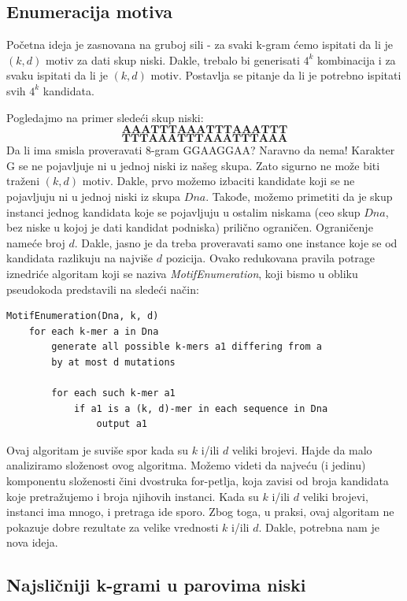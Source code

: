 \subsection{Enumeracija motiva}
Početna ideja je zasnovana na gruboj sili - za svaki k-gram ćemo ispitati da li je $(k, d)$ motiv za dati skup niski. Dakle, trebalo bi generisati $4^k$ kombinacija i za svaku ispitati da li je $(k, d)$ motiv. Postavlja se pitanje da li je potrebno ispitati svih $4^k$ kandidata. 

\noindent Pogledajmo na primer sledeći skup niski:
$$\textbf{AAATTTAAATTTAAATTT}$$ 
$$\textbf{TTTAAATTTAAATTTAAA}$$
Da li ima smisla proveravati 8-gram GGAAGGAA?
Naravno da nema! Karakter G se ne pojavljuje ni u jednoj niski iz našeg skupa.
Zato sigurno ne može biti traženi $(k,d)$ motiv.
Dakle, prvo možemo izbaciti kandidate koji se ne pojavljuju ni u jednoj niski iz skupa $Dna$.
Takođe, možemo primetiti da je skup instanci jednog kandidata koje se pojavljuju u ostalim niskama (ceo skup $Dna$, bez niske u kojoj je dati kandidat podniska) prilično ograničen. Ograničenje nameće broj $d$. Dakle, jasno je da treba proveravati samo one instance koje se od kandidata razlikuju na najviše $d$ pozicija. 
Ovako redukovana pravila potrage iznedriće algoritam koji se naziva \textit{MotifEnumeration}, koji bismo u obliku pseudokoda predstavili na sledeći način:

\begin{lstlisting}
MotifEnumeration(Dna, k, d)
	for each k-mer a in Dna
		generate all possible k-mers a1 differing from a 
		by at most d mutations
    	
		for each such k-mer a1
			if a1 is a (k, d)-mer in each sequence in Dna
				output a1
\end{lstlisting}

\noindent Ovaj algoritam je suviše spor kada su $k$ i/ili $d$ veliki brojevi. Hajde da malo analiziramo složenost ovog algoritma. Možemo videti da najveću (i jedinu) komponentu složenosti čini dvostruka for-petlja, koja zavisi od broja kandidata koje pretražujemo i broja njihovih instanci. Kada su $k$ i/ili $d$ veliki brojevi, instanci ima mnogo, i pretraga ide sporo. Zbog toga, u praksi, ovaj algoritam ne pokazuje dobre rezultate za velike vrednosti $k$ i/ili $d$.
Dakle, potrebna nam je nova ideja.

\subsection{Najsličniji k-grami u parovima niski}


